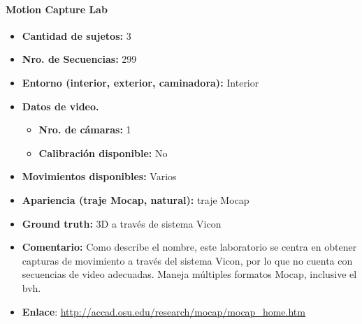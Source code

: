 \paragraph{Motion Capture Lab}
\begin{itemize}
	\item \textbf{Cantidad de sujetos:} 3
	\item \textbf{Nro. de Secuencias:} 299
	\item \textbf{Entorno (interior, exterior, caminadora):} Interior
	\item \textbf{Datos de video.} 
	\begin{itemize}
		\item \textbf{Nro. de cámaras:} 1
		\item \textbf{Calibración disponible:} No
	\end{itemize}
	\item \textbf{Movimientos disponibles:} Varios
	\item \textbf{Apariencia (traje Mocap, natural):} traje Mocap
	\item \textbf{Ground truth:} 3D a través de sistema Vicon
	\item \textbf{Comentario:} Como describe el nombre, este laboratorio se centra en obtener capturas de movimiento a través del sistema Vicon, por lo que no cuenta con secuencias de video adecuadas. Maneja múltiples formatos Mocap, inclusive el bvh.
	\item \textbf{Enlace}: \textcolor{blue}{\underline{\url{http://accad.osu.edu/research/mocap/mocap_home.htm}}}
\end{itemize}


